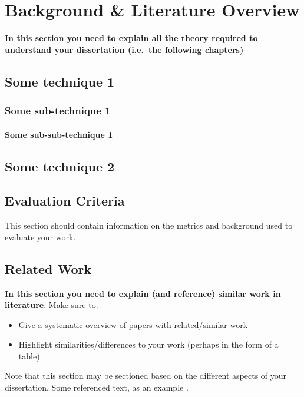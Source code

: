 \chapter{Background \& Literature Overview}
\textbf{In this section you need to explain all the theory required to understand your dissertation (i.e.\ the following chapters)}
\section{Some technique 1}
\blindtext
\subsection{Some sub-technique 1}
\blindtext
\subsubsection{Some sub-sub-technique 1}
\blindtext
\section{Some technique 2}
\blindtext
\section{Evaluation Criteria}
This section should contain information on the metrics and background used to evaluate your work.
\section{Related Work}
\textbf{In this section you need to explain (and reference) similar work in literature}.  Make sure to:

\begin{itemize}
 \item Give a systematic overview of papers with related/similar work
 \item Highlight similarities/differences to your work (perhaps in the form of a table)
\end{itemize}

Note that this section may be sectioned based on the different aspects of your dissertation.  Some referenced text, as an example \citep{Arrighi2003, WithersMartinez2012, Ebejer2016}.

